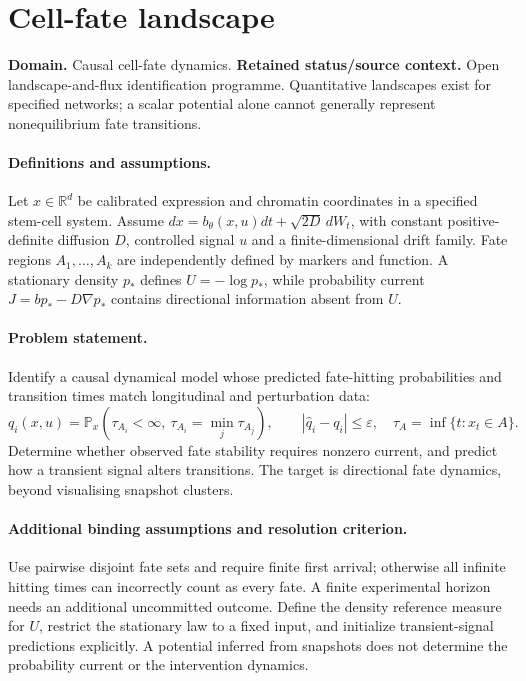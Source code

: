 \documentclass[11pt]{article}
\begin{document}
\section*{Cell-fate landscape}
\label{prob:125}
\label{rank:142}
\par\smallskip

\noindent\textbf{Domain.} Causal cell-fate dynamics. \quad \textbf{Retained status/source context.} Open landscape-and-flux identification programme. Quantitative landscapes exist for specified networks; a scalar potential alone cannot generally represent nonequilibrium fate transitions.
\paragraph{Definitions and assumptions.} Let $x\in\mathbb{R}^d$ be calibrated expression and chromatin coordinates in a specified stem-cell system. Assume $dx=b_\theta(x,u)dt+\sqrt{2D}\,dW_t$, with constant positive-definite diffusion $D$, controlled signal $u$ and a finite-dimensional drift family. Fate regions $A_1,\ldots,A_k$ are independently defined by markers and function. A stationary density $p_*$ defines $U=-\log p_*$, while probability current $J=b p_*-D\nabla p_*$ contains directional information absent from $U$.
\paragraph{Problem statement.} Identify a causal dynamical model whose predicted fate-hitting probabilities and transition times match longitudinal and perturbation data:
\[
q_i(x,u)=\mathbb{P}_x(\tau_{A_i}<\infty,\ \tau_{A_i}=\min_j\tau_{A_j}),
\qquad
|\widehat q_i-q_i|\leq\varepsilon,
\quad\tau_A=\inf\{t:x_t\in A\}.
\]
Determine whether observed fate stability requires nonzero current, and predict how a transient signal alters transitions. The target is directional fate dynamics, beyond visualising snapshot clusters.
\paragraph{Additional binding assumptions and resolution criterion.} Use pairwise disjoint fate sets and require finite first arrival; otherwise all infinite hitting times can incorrectly count as every fate. A finite experimental horizon needs an additional uncommitted outcome. Define the density reference measure for $U$, restrict the stationary law to a fixed input, and initialize transient-signal predictions explicitly. A potential inferred from snapshots does not determine the probability current or the intervention dynamics.
\end{document}
